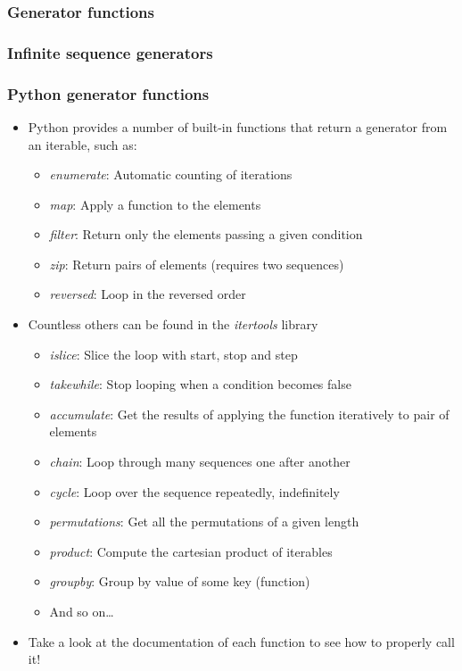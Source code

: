\documentclass[9pt]{beamer}
\begin{document}
\begin{frame}
  \frametitle{Generator functions}
  
\end{frame}


\begin{frame}
  \frametitle{Infinite sequence generators}
  
\end{frame}


\begin{frame}
  \frametitle{Python generator functions}

  \begin{itemize}
    \item Python provides a number of built-in functions that return a generator from an iterable, such as:
    \begin{itemize}
      \item \emph{enumerate}: Automatic counting of iterations
      \item \emph{map}: Apply a function to the elements
      \item \emph{filter}: Return only the elements passing a given condition
      \item \emph{zip}: Return pairs of elements (requires two sequences)
      \item \emph{reversed}: Loop in the reversed order
    \end{itemize}

    \item Countless others can be found in the \alert{\emph{itertools}} library
    \begin{itemize}
      \item \emph{islice}: Slice the loop with start, stop and step
      \item \emph{takewhile}: Stop looping when a condition becomes false
      \item \emph{accumulate}: Get the results of applying the function iteratively to pair of elements
      \item \emph{chain}: Loop through many sequences one after another
      \item \emph{cycle}: Loop over the sequence repeatedly, indefinitely
      \item \emph{permutations}: Get all the permutations of a given length
      \item \emph{product}: Compute the cartesian product of iterables
      \item \emph{groupby}: Group by value of some key (function)
      \item And so on\dots
    \end{itemize}

    \medskip

    \item Take a look at the documentation of each function to see how to
          properly call it!
  \end{itemize}
\end{frame}
\end{document}
